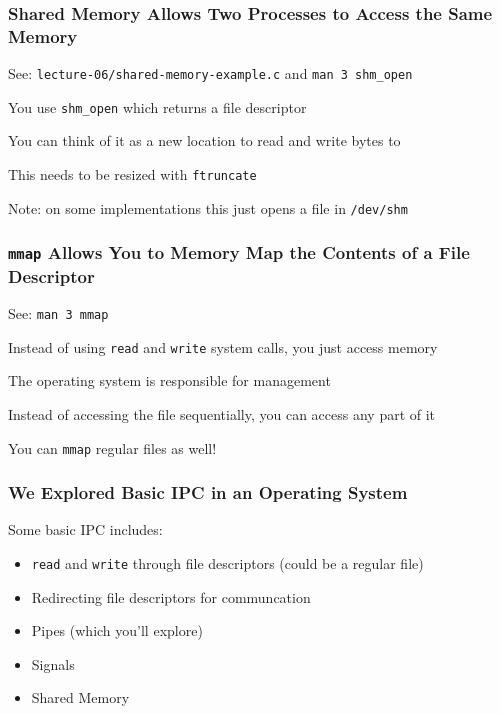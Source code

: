   \begin{frame}
    \frametitle{Shared Memory Allows Two Processes to Access the Same Memory}

    See: \texttt{lecture-06/shared-memory-example.c} and \texttt{man 3 shm\_open}

    \vspace{2em}

    You use \texttt{shm\_open} which returns a file descriptor

    \vspace{2em}

    You can think of it as a new location to read and write bytes to

    \hspace{2em} This needs to be resized with \texttt{ftruncate}

    \vspace{2em}

    Note: on some implementations this just opens a file in \texttt{/dev/shm}
  \end{frame}

  \begin{frame}
    \frametitle{\texttt{mmap} Allows You to Memory Map the Contents of a File Descriptor}

    See: \texttt{man 3 mmap}

    \vspace{2em}

    Instead of using \texttt{read} and \texttt{write} system calls, you just access memory

    \hspace{2em} The operating system is responsible for management

    \vspace{2em}

    Instead of accessing the file sequentially, you can access any part of it

    \vspace{2em}

    You can \texttt{mmap} regular files as well!
  \end{frame}

  \begin{frame}
    \frametitle{We Explored Basic IPC in an Operating System}

    Some basic IPC includes:
    \begin{itemize}
      \item \texttt{read} and \texttt{write} through file descriptors (could be a regular file)
      \item Redirecting file descriptors for communcation
      \item Pipes (which you'll explore)
      \item Signals
      \item Shared Memory
    \end{itemize}
  \end{frame}

